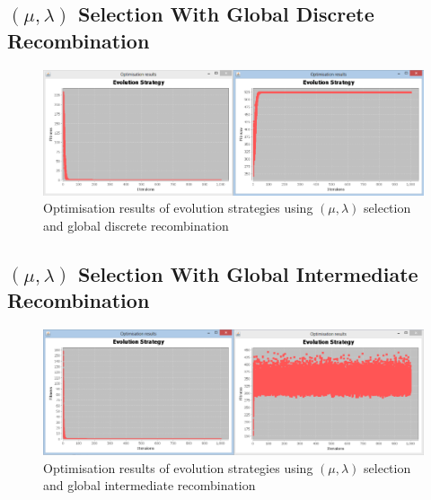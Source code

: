 \begin{landscape}
\subsection{$(\mu,\lambda)$ Selection With Global Discrete Recombination}
\label{sec:appendix13}
  \begin{figure}[h]
    \begin{center}
      \includegraphics{Figures/es_comma_gd}
    \end{center}
    \caption{Optimisation results of evolution strategies using $(\mu,\lambda)$ selection and global discrete recombination}
    \label{fig:phase1}
  \end{figure}
\end{landscape}

\begin{landscape}
\subsection{$(\mu,\lambda)$ Selection With Global Intermediate Recombination}
\label{sec:appendix14}
  \begin{figure}[h]
    \begin{center}
      \includegraphics{Figures/es_comma_gi}
    \end{center}
    \caption{Optimisation results of evolution strategies using $(\mu,\lambda)$ selection and global intermediate recombination}
    \label{fig:phase1}
  \end{figure}
\end{landscape}

